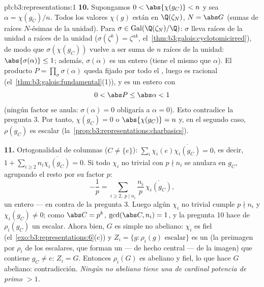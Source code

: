 \begin{solution}{pb:b3:representations:1}
\textbf{10.} Supongamos $0 < \abs{\chi(g_C)} < n$ y sea $\alpha
= \chi(g_C)/n$. Todos los valores $\chi(g)$ están en $\Q(\zeta_N)$, $N =
\abs G$ (sumas de raíces $N$-ésimas de la unidad). Para $\sigma \in
\operatorname{Gal}(\Q(\zeta_N)/\Q)$: $\sigma$ lleva raíces de la unidad
a raíces de la unidad ($\sigma(\zeta^k) = \zeta^{ak}$,
el~\cref{thm:b3:galois:cyclotomicirred}), de modo que
$\sigma(\chi(g_C))$ vuelve a ser suma de $n$ raíces de la unidad:
$\abs{\sigma(\alpha)}
\leq 1$; además, $\sigma(\alpha)$ es un entero
 (tiene el mismo
 que $\alpha$). El
producto $P =
\prod_\sigma \sigma(\alpha)$ queda fijado por todo el
, luego es racional
(el~\cref{thm:b3:galois:fundamental}(1)), y es un entero
 con
\[
0 < \abs P \leq \abs\alpha < 1
\]
(ningún factor se anula: $\sigma(\alpha) = 0$ obligaría a $\alpha =
0$). Esto contradice la pregunta 3. Por tanto, $\chi(g_C) = 0$ o
$\abs{\chi(g_C)} = n$ y, en el segundo caso, $\rho(g_C)$ es escalar
(la~\cref{prop:b3:representations:charbasics}).

\textbf{11.} Ortogonalidad de columnas ($C \neq \{e\}$):
$\sum_i \chi_i(e)\overline{\chi_i(g_C)} = 0$, es decir, $1 +
\sum_{i \geq 2} n_i\overline{\chi_i(g_C)} = 0$. Si todo $\chi_i$ no
trivial con $p \nmid n_i$ se anulara en $g_C$, agrupando el resto por su
factor $p$:
\[
-\frac1p = \sum_{i \geq 2,\ p \mid n_i}
\frac{n_i}{p}\,\overline{\chi_i(g_C)},
\]
un entero  --- en contra de
la pregunta 3. Luego algún $\chi_i$ no trivial cumple $p \nmid n_i$ y
$\chi_i(g_C) \neq 0$; como $\abs C = p^k$, $\gcd(\abs C, n_i) = 1$, y la
pregunta 10 hace de $\rho_i(g_C)$ un escalar. Ahora bien, $G$ es simple
no abeliano: $\chi_i$ es fiel (el~\cref{exo:b3:representations:6}(c)) y
$Z_i = \{g : \rho_i(g) \text{ escalar}\}$ es un
 (la preimagen por
$\rho_i$ de los escalares, que forman un  --- de hecho
central --- de la imagen) que contiene $g_C \neq e$: $Z_i = G$. Entonces
$\rho_i(G)$ es abeliano y fiel, lo que hace $G$ abeliano: contradicción.
\emph{Ningún  no abeliano tiene una
 de cardinal potencia
de primo
$> 1$.}


\end{solution}
